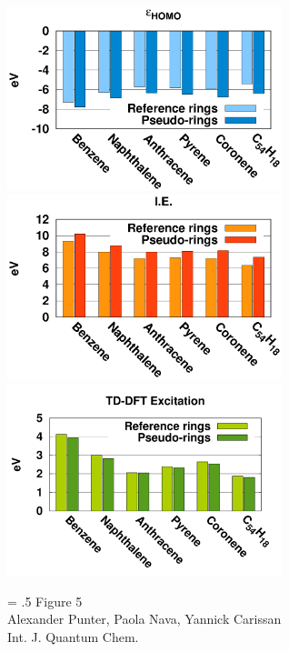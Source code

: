 \documentclass[12pt]{article}
\begin{document}
\begin{figure}
\begin{center}
\includegraphics[width=8cm]{ring_pbe0_homo_uhf}\\
\includegraphics[width=8cm]{ring_pbe0_ie_uhf}\\
\includegraphics[width=8cm]{ring_pbe0_tddft}\\
\end{center}
{\Large
\begin{minipage}[t]{3in}
\baselineskip = .5\baselineskip
Figure 5 \\
Alexander Punter, Paola Nava, Yannick Carissan\\
Int. J. Quantum Chem.
\end{minipage}
}
\end{figure}
\end{document}
